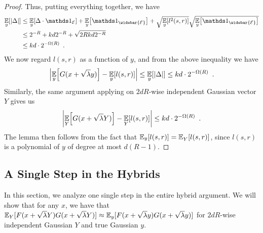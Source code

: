 \documentclass[12pt]{article}
\begin{document}
\begin{proof}
	Thus, putting everything together, we have
	\begin{align*}
		\expect{y}{\abs{\Delta}}
		&\leq \expect{y}{\Delta \cdot \id_\EE} + \expect{y}{\id_{\widebar{\EE}}} + \sqrt{\expect{y}{l^2(s,r)}} \sqrt{ \expect{y}{\id_{\widebar{\EE}}}} \\
		&\leq 2^{-R} + kd2^{-R} + \sqrt{2Rkd2^{-R}} \\
		&\leq kd\cdot 2^{-\Omega(R)}
		\enspace .
	\end{align*}
We now regard $l(s,r)$ as a function of $y$, and from the above inequality we have
	\begin{equation*}
		\left|\operatorname*{\mathbb{E}}_{\substack{y}}\!\left[G(x+\sqrt{\lambda}y)\right] - \operatorname*{\mathbb{E}}_{\substack{y}}\!\left[l(s,r)\right] \right|\leq 
		\operatorname*{\mathbb{E}}_{\substack{y}}\!\left[\left|\Delta \right|\right]\leq kd\cdot 2^{-\Omega(R)}\enspace . 
	\end{equation*}
	Similarly, the same argument applying on $2dR$-wise independent Gaussian vector $Y$ gives us
	\begin{equation*}
		\left|\operatorname*{\mathbb{E}}_{\substack{Y}}\!\left[G(x+\sqrt{\lambda}Y)\right] - \operatorname*{\mathbb{E}}_{\substack{Y}}\!\left[l(s,r)\right] \right|\leq kd\cdot 2^{-\Omega(R)}\enspace . 
	\end{equation*}
	The lemma then follows from the fact that $\operatorname*{\mathbb{E}}_{\substack{y}}\!\left[l(s,r)\right] = \operatorname*{\mathbb{E}}_{\substack{Y}}\!\left[l(s,r)\right]$, since $l(s,r)$ is a polynomial of $y$ of degree at most $d(R-1)$.
\end{proof}	

\subsection{A Single Step in the Hybrids} \label{sec:single}
In this section,
we analyze one single step in the entire hybrid argument.
We will show that for any $x$, we have that
$\operatorname*{\mathbb{E}}_Y[F(x+\sqrt{\lambda}Y)G(x+\sqrt{\lambda}Y)]\approx
\operatorname*{\mathbb{E}}_y[F(x+\sqrt{\lambda}y)G(x+\sqrt{\lambda}y)]$ for $2dR$-wise independent Gaussian $Y$ and true Gaussian $y$.
\end{document}
